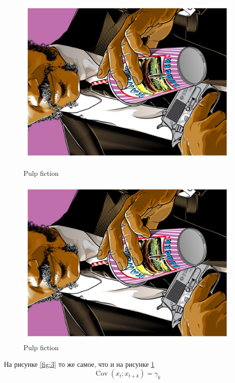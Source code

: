 \documentclass[12pt, a4paper]{article}
\DeclareMathOperator{\Cov}{Cov}
\begin{document}
\begin{figure}[H] 
\centering
\includegraphics[width=0.3\paperwidth, angle=270]{pop1.pdf}
\caption{Pulp fiction}  \label{fig:3}
\includegraphics[width=0.3\paperwidth, angle=270]{pop1.pdf}
\caption{Pulp fiction} \label{fig:1}
\end{figure} 

На рисунке \ref{fig:3} то же самое, что и на рисунке \ref{fig:1} \\

\begin{equation}
\Cov (x_t ; x_{t+k}) = \gamma_k
\end{equation}

\newpage
\end{document}
